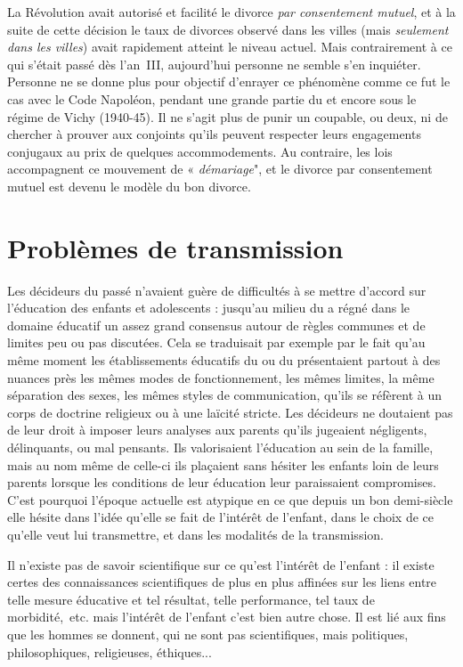 \begin{table}[t]
\begin{table}[t]
 La Révolution avait autorisé et facilité le divorce \emph{par consentement mutuel}, et à la suite de cette décision le taux de divorces observé dans les villes (mais \emph{seulement dans les villes}) avait rapidement atteint le niveau actuel. Mais contrairement à ce qui s'était passé dès l'an~III, aujourd'hui personne ne semble s'en inquiéter. Personne ne se donne plus pour objectif d'enrayer ce phénomène comme ce fut le cas avec le Code Napoléon, pendant une grande partie du  et encore sous le régime de Vichy (1940-45). Il ne s'agit plus de punir un coupable, ou deux, ni de chercher à prouver aux conjoints qu'ils peuvent respecter leurs engagements conjugaux au prix de quelques accommodements. Au contraire, les lois accompagnent ce mouvement de « \emph{démariage}", et le divorce par consentement mutuel est devenu le modèle du bon divorce. 

 


 


 
\section{Problèmes de transmission}


 Les décideurs du passé n'avaient guère de difficultés à se mettre d'accord sur l'éducation des enfants et adolescents : jusqu'au milieu du  a régné dans le domaine éducatif un assez grand consensus autour de règles communes et de limites peu ou pas discutées. Cela se traduisait par exemple par le fait qu'au même moment les établissements éducatifs du  ou du  présentaient partout à des nuances près les mêmes modes de fonctionnement, les mêmes limites, la même séparation des sexes, les mêmes styles de communication, qu'ils se réfèrent à un corps de doctrine religieux ou à une laïcité stricte. Les décideurs ne doutaient pas de leur droit à imposer leurs analyses aux parents qu'ils jugeaient négligents, délinquants, ou mal pensants. Ils valorisaient l'éducation au sein de la famille, mais au nom même de celle-ci ils plaçaient sans hésiter les enfants loin de leurs parents lorsque les conditions de leur éducation leur paraissaient compromises. C'est pourquoi l'époque actuelle est atypique en ce que depuis un bon demi-siècle elle hésite dans l'idée qu'elle se fait de l'intérêt de l'enfant, dans le choix de ce qu'elle veut lui transmettre, et dans les modalités de la transmission. 

 Il n'existe pas de savoir scientifique sur ce qu'est l'intérêt de l'enfant : il existe certes des connaissances scientifiques de plus en plus affinées sur les liens entre telle mesure éducative et tel résultat, telle performance, tel taux de morbidité,~etc. mais l'intérêt de l'enfant c'est bien autre chose. Il est lié aux fins que les hommes se donnent, qui ne sont pas scientifiques, mais politiques, philosophiques, religieuses, éthiques... 


\end{table}
\end{table}
